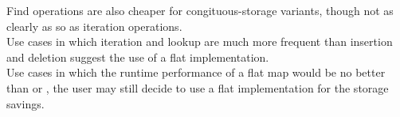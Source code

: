 Find operations are also cheaper for congituous-storage variants, though not
as clearly as so as iteration operations.\\

Use cases in which iteration and lookup are much more frequent than insertion
and deletion suggest the use of a flat implementation.\\

Use cases in which the runtime performance of a flat map would be no better
than  or , the user may still decide to use a
flat implementation for the storage savings.

